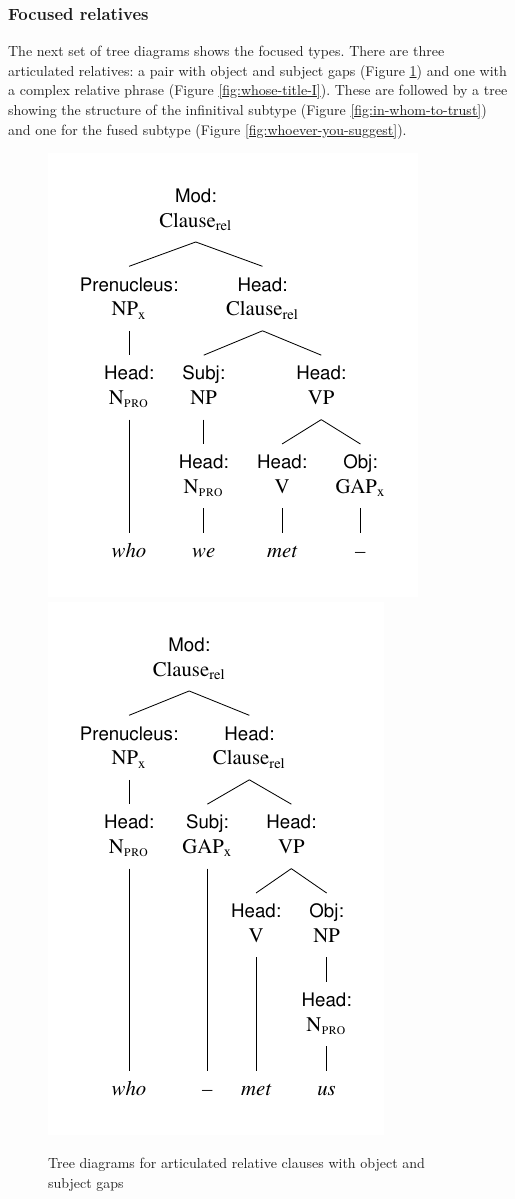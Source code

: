 \newpage
\subsubsection*{Focused relatives}
The next set of tree diagrams shows the focused types. There are three articulated relatives: a pair with object and subject gaps (Figure \ref{fig:who-met-us}) and one with a complex relative phrase (Figure \ref{fig:whose-title-I}). These are followed by a tree showing the structure of the infinitival subtype (Figure \ref{fig:in-whom-to-trust}) and one for the fused subtype (Figure \ref{fig:whoever-you-suggest}).

\begin{figure}[ht]
    \includegraphics{figures/who-we-met.pdf}
    \includegraphics{figures/who-met-us.pdf}
    \caption{Tree diagrams for articulated relative clauses with object and subject gaps}
    \label{fig:who-met-us}
\end{figure}

